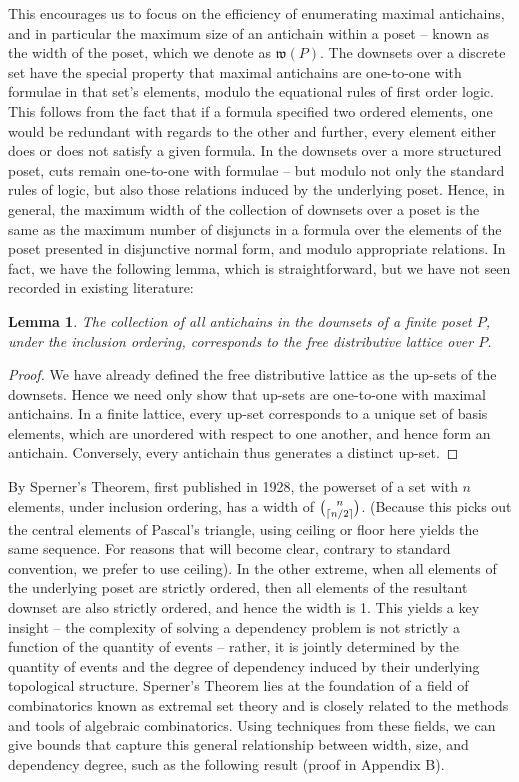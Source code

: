 \documentclass[hoptionsi,review,format=acmsmall]{acmart}
\newtheorem{lemma}[theorem]{Lemma}
\theoremstyle{definition}
\newcommand{\Wf}{\mathfrak{w}}
\DeclarePairedDelimiter\ceil{\lceil}{\rceil}
\begin{document}
This encourages us to focus on the efficiency of enumerating maximal antichains, and in particular the maximum size of an antichain within a poset -- known as the width of the poset, which we denote as \(\Wf(P)\). The downsets over a discrete set have the special property that maximal antichains are one-to-one with formulae in that set's elements, modulo the equational rules of first order logic. This follows from the fact that if a formula specified two ordered elements, one would be redundant with regards to the other and further, every element either does or does not satisfy a given formula. In the downsets over a more structured poset, cuts remain one-to-one with formulae -- but modulo not only the standard rules of logic, but also those relations induced by the underlying poset. Hence, in general, the maximum width of the collection of downsets over a poset is the same as the maximum number of disjuncts in a formula over the elements of the poset presented in disjunctive normal form, and modulo appropriate relations. In fact, we have the following lemma, which is straightforward, but we have not seen recorded in existing literature:

\begin{lemma}
The collection of all antichains in the downsets of a finite poset \(P\), under the inclusion ordering, corresponds to the free distributive lattice over \(P\).
\end{lemma}
\begin{proof}
We have already defined the free distributive lattice as the up-sets of the downsets. Hence we need only show that up-sets are one-to-one with maximal antichains. In a finite lattice, every up-set corresponds to a unique set of basis elements, which are unordered with respect to one another, and hence form an antichain. Conversely, every antichain thus generates a distinct up-set.
\end{proof}

By Sperner's Theorem, first published in 1928, the powerset of a set with \(n\) elements, under inclusion ordering, has a width of \(\binom{n}{\ceil{n/2}}\). (Because this picks out the central elements of Pascal's triangle, using ceiling or floor here yields the same sequence. For reasons that will become clear, contrary to standard convention, we prefer to use ceiling). In the other extreme, when all elements of the underlying poset are strictly ordered, then all elements of the resultant downset are also strictly ordered, and hence the width is 1. This yields a key insight -- the complexity of solving a dependency problem is not strictly a function of the quantity of events -- rather, it is jointly determined by the quantity of events and the degree of dependency induced by their underlying topological structure. Sperner's Theorem lies at the foundation of a field of combinatorics known as extremal set theory and is closely related to the methods and tools of algebraic combinatorics. Using techniques from these fields, we can give bounds that capture this general relationship between width, size, and dependency degree, such as the following result (proof in Appendix B).
\end{document}
